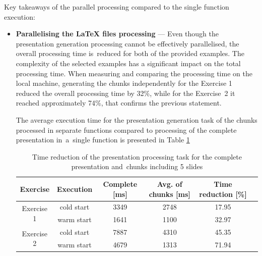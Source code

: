 Key takeaways of the parallel processing compared to the single function execution:

\begin{itemize}
    \item \textbf{Parallelising the LaTeX files processing} --- Even though the presentation generation processing cannot be effectively parallelised, the overall processing time is~reduced for both of the provided examples.
    The complexity of the selected examples has a significant impact on the total processing time.
    When measuring and comparing the processing time on the local machine, generating the chunks independently for the Exercise 1 reduced the overall processing time by 32\%, while for the Exercise~2 it reached approximately 74\%, that confirms the previous statement.
  
    The average execution time for the presentation generation task of the chunks processed in separate functions compared to processing of the complete presentation in~a~single function is presented in Table \ref{table:overhead-of-the-presentation-processing-task-for-the-whole-presentation-and-chunks-including-5-slides}

    \begin{table}[h]
        \centering
        \begin{tabular}{ |c|c|c|c|c|c| } 
        \hline
        Exercise & Execution & Complete [ms] & Avg. of chunks [ms] & Time reduction [\%] \\
        \hline
        \multirow{2}{*}{Exercise 1} & cold start & 3349 & 2748 & 17.95 \\
        & warm start & 1641 & 1100 & 32.97 \\
        \hline
        \multirow{2}{*}{Exercise 2} & cold start & 7887 & 4310 & 45.35 \\
        & warm start & 4679 & 1313 & 71.94 \\
        \hline
        \end{tabular}
        \caption{Time reduction of the presentation processing task for the complete presentation and~chunks including 5 slides}
        \label{table:overhead-of-the-presentation-processing-task-for-the-whole-presentation-and-chunks-including-5-slides}
    \end{table}


\end{itemize}
